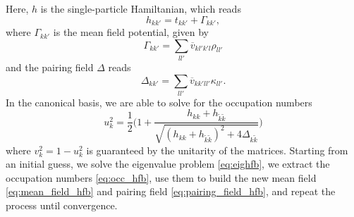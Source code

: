 Here, $h$ is the single-particle Hamiltanian, which reads
\begin{equation}
    h_{kk'} = t_{kk'} +\Gamma_{kk'},
\end{equation}
where $\Gamma_{kk'}$ is the mean field potential, given by
\begin{equation}
    \label{eq:mean_field_hfb}
    \Gamma_{kk'} = \sum_{ll'}\overline{v}_{kl'k'l}\rho_{ll'}
    \end{equation}
and the pairing field $\Delta$ reads
\begin{equation}
    \label{eq:pairing_field_hfb}
    \Delta_{kk'} = \sum_{ll'}\overline{v}_{kk'll'}\kappa_{ll'}.
\end{equation}
In the canonical basis, we are able to solve for the occupation numbers
\begin{equation}
    \label{eq:occ_hfb}
    u_k^2 = \frac 1 2 \bigg(1+\frac{h_{kk}+h_{\tilde k \tilde k}}{\sqrt{(h_{kk}+h_{\tilde k \tilde k})^2+4\Delta_{k\tilde k}}}\bigg)
\end{equation}
where $v_k^2 = 1 - u_k^2$ is guaranteed by the unitarity of the matrices.
Starting from an initial guess, we solve the eigenvalue problem \eqref{eq:eighfb}, we extract the occupation numbers \eqref{eq:occ_hfb}, use them to build the new mean field \eqref{eq:mean_field_hfb} and pairing field \eqref{eq:pairing_field_hfb}, and repeat the process until convergence.
